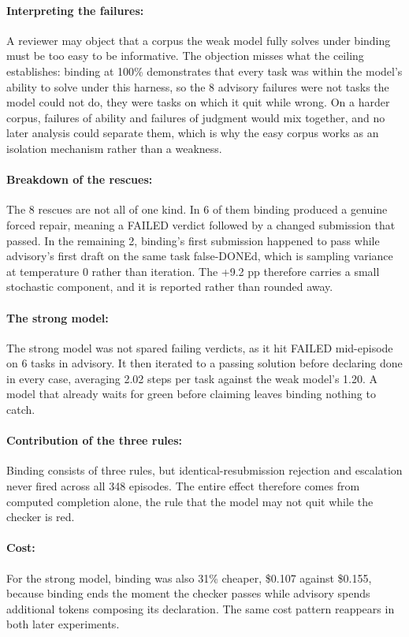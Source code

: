 \paragraph{Interpreting the failures:} A reviewer may object that a corpus the weak model fully solves under binding must be too easy to be informative. The objection misses what the ceiling establishes: binding at 100\% demonstrates that every task was within the model's ability to solve under this harness, so the 8 advisory failures were not tasks the model could not do, they were tasks on which it quit while wrong. On a harder corpus, failures of ability and failures of judgment would mix together, and no later analysis could separate them, which is why the easy corpus works as an isolation mechanism rather than a weakness.

\paragraph{Breakdown of the rescues:} The 8 rescues are not all of one kind. In 6 of them binding produced a genuine forced repair, meaning a FAILED verdict followed by a changed submission that passed. In the remaining 2, binding's first submission happened to pass while advisory's first draft on the same task false-DONEd, which is sampling variance at temperature 0 rather than iteration. The +9.2 pp therefore carries a small stochastic component, and it is reported rather than rounded away.

\paragraph{The strong model:} The strong model was not spared failing verdicts, as it hit FAILED mid-episode on 6 tasks in advisory. It then iterated to a passing solution before declaring done in every case, averaging 2.02 steps per task against the weak model's 1.20. A model that already waits for green before claiming leaves binding nothing to catch.

\paragraph{Contribution of the three rules:} Binding consists of three rules, but identical-resubmission rejection and escalation never fired across all 348 episodes. The entire effect therefore comes from computed completion alone, the rule that the model may not quit while the checker is red.

\paragraph{Cost:} For the strong model, binding was also 31\% cheaper, \$0.107 against \$0.155, because binding ends the moment the checker passes while advisory spends additional tokens composing its declaration. The same cost pattern reappears in both later experiments.
